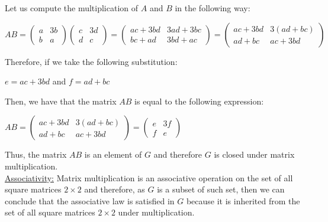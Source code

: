 \documentclass[a4paper,openany,11pt]{book}
\begin{document}
Let us compute the multiplication of $A$ and $B$ in the following way:

\begin{center}
	$AB = \left(\begin{array}{cc}
	a & 3b\\
	b & a
	\end{array}\right) \left(\begin{array}{cc}
	c & 3d\\
	d & c
	\end{array}\right) = \left(\begin{array}{cc}
	ac + 3bd & 3ad+3bc \\
	bc+ad & 3bd+ac
	\end{array}\right) = \left(\begin{array}{cc}
	ac + 3bd & 3(ad+bc) \\
	ad+bc & ac+3bd
	\end{array}\right)$
\end{center}

Therefore, if we take the following substitution:

\begin{center}
	$e = ac + 3bd$ \hspace{0.1cm} and \hspace{0.1cm} $f = ad+bc$
\end{center}

Then, we have that the matrix $AB$ is equal to the following expression:

\begin{center}
	$AB = \left(\begin{array}{cc}
	ac + 3bd & 3(ad+bc) \\
	ad+bc & ac+3bd
	\end{array}\right) = \left(\begin{array}{cc}
	e & 3f \\
	f & e
	\end{array}\right)$
\end{center}

Thus, the matrix $AB$ is an element of $G$ and therefore $G$ is closed under matrix multiplication.\\

\underline{Associativity:} Matrix multiplication is an associative operation on the set of all square matrices $2\times2$ and therefore, as $G$ is a subset of such set, then we can conclude that the associative law is satisfied in $G$ because it is inherited from the set of all square matrices $2\times2$ under multiplication.\\
\end{document}
